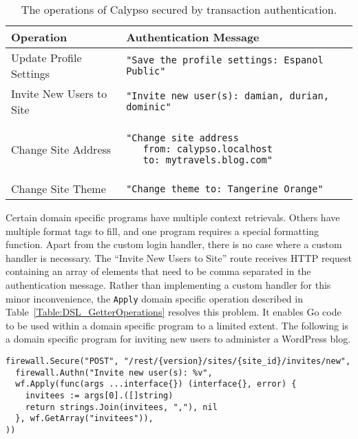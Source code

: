 \begin{table}[h]
\centering

\begin{tabular}{ m{5cm} m{9cm}  } 
 \hline
 Operation & Authentication Message \\ 
 \hline \hline

 Update Profile Settings & \lstinline{"Save the profile settings: Espanol Public"} \\ \hline

 Invite New Users to Site & \lstinline{"Invite new user(s): damian, durian, dominic"} \\ \hline

 Change Site Address & 
 \begin{lstlisting} 
"Change site address
   from: calypso.localhost
   to: mytravels.blog.com"
\end{lstlisting} 
\\ \hline

 Change Site Theme & \lstinline{"Change theme to: Tangerine Orange"} \\ \hline

\end{tabular}
\caption{The operations of Calypso secured by transaction authentication.}
\label{Table:CalypsoSecuredRoutes}
\end{table}

Certain domain specific programs have multiple context retrievals. Others have multiple format tags to fill, and one program requires a special formatting function. Apart from the custom login handler, there is no case where a custom handler is necessary. 
The ``Invite New Users to Site'' route receives HTTP request containing an array of elements that need to be comma separated in the authentication message. Rather than implementing a custom handler for this minor inconvenience, the \lstinline{Apply} domain specific operation described in Table~\ref{Table:DSL_GetterOperations} resolves this problem. It enables Go code to be used within a domain specific program to a limited extent. The following is a domain specific program for inviting new users to administer a WordPress blog.

\iffalse
all of the routes in Calypso are protected using the DSL. 
\fi

\begin{lstlisting}[float=h]
firewall.Secure("POST", "/rest/{version}/sites/{site_id}/invites/new", 
  firewall.Authn("Invite new user(s): %v",
  wf.Apply(func(args ...interface{}) (interface{}, error) {
    invitees := args[0].([]string)
    return strings.Join(invitees, ","), nil
  }, wf.GetArray("invitees")),
))
\end{lstlisting}


